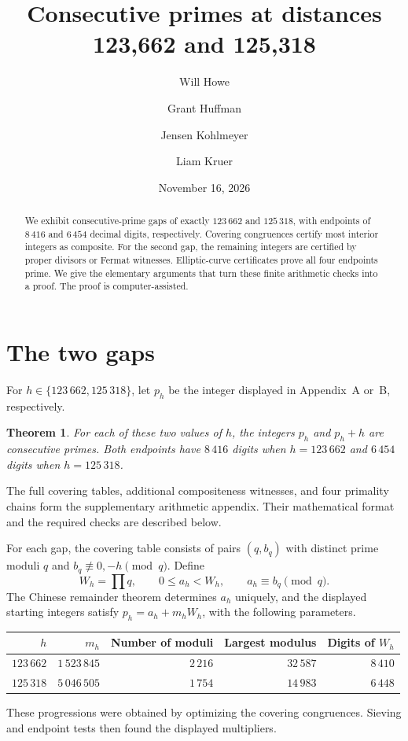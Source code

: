 \documentclass[11pt]{amsart}
\title[Two certified prime gaps]{Consecutive primes at distances 123,662 and 125,318}
\author{Will Howe}
\author{Grant Huffman}
\author{Jensen Kohlmeyer}
\author{Liam Kruer}
\date{November 16, 2026}
\newtheorem{theorem}{Theorem}[section]
\begin{document}
\begin{abstract}
We exhibit consecutive-prime gaps of exactly $123\,662$ and $125\,318$,
with endpoints of $8\,416$ and $6\,454$ decimal digits, respectively.
Covering congruences certify most interior integers as composite. For the
second gap, the remaining integers are certified by proper divisors or
Fermat witnesses. Elliptic-curve certificates prove all four endpoints prime.
We give the elementary arguments that turn these finite arithmetic checks
into a proof. The proof is computer-assisted.
\end{abstract}
\maketitle

\section{The two gaps}
For $h\in\{123\,662,125\,318\}$, let $p_h$ be the integer displayed in
Appendix~A or~B, respectively.
\begin{theorem}\label{thm:gaps}
For each of these two values of $h$, the integers $p_h$ and $p_h+h$ are
consecutive primes. Both endpoints have $8\,416$ digits when $h=123\,662$
and $6\,454$ digits when $h=125\,318$.
\end{theorem}
The full covering tables, additional compositeness witnesses, and four
primality chains form the supplementary arithmetic appendix. Their mathematical
format and the required checks are described below.

For each gap, the covering table consists of pairs $(q,b_q)$ with distinct
prime moduli $q$ and $b_q\not\equiv0,-h\pmod q$. Define
\[
 W_h=\prod q,\qquad 0\le a_h<W_h,\qquad a_h\equiv b_q\pmod q.
\]
The Chinese remainder theorem determines $a_h$ uniquely, and the displayed
starting integers satisfy $p_h=a_h+m_hW_h$, with the following parameters.
\begin{center}
\begin{tabular}{r r r r r}
\toprule
$h$ & $m_h$ & Number of moduli & Largest modulus & Digits of $W_h$\\
\midrule
$123\,662$ & $1\,523\,845$ & $2\,216$ & $32\,587$ & $8\,410$\\
$125\,318$ & $5\,046\,505$ & $1\,754$ & $14\,983$ & $6\,448$\\
\bottomrule
\end{tabular}
\end{center}
These progressions were obtained by optimizing the covering congruences.
Sieving and endpoint tests then found the displayed multipliers.
\end{document}
